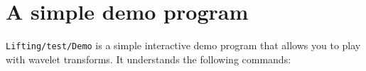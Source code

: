 %
%
% 
% 
% 
% 
%

\section{A simple demo program}

\texttt{Lifting/test/Demo} is a simple interactive demo program that allows you
to play with wavelet transforms. It understands the following commands:

